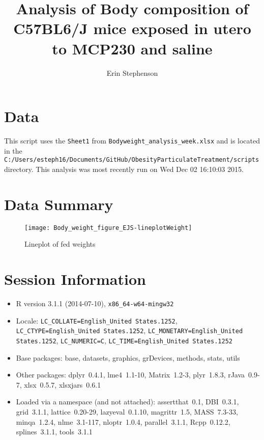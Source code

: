 \documentclass{article}
\begin{document}


\title{Analysis of Body composition of C57BL6/J mice exposed in utero to MCP230 and saline}
\author{Erin Stephenson}
\date{\toWeek}
\maketitle

\section*{Data}
This script uses the \verb+Sheet1+ from \verb+Bodyweight_analysis_week.xlsx+ and is located in the \verb+C:/Users/esteph16/Documents/GitHub/ObesityParticulateTreatment/scripts+ directory.  This analysis was most recently run on Wed Dec 02 16:10:03 2015.  

\section*{Data Summary}

\begin{figure}
\begin{center}
\texttt{[image: Body\_weight\_figure\_EJS-lineplotWeight]}
\end{center}
\caption{Lineplot of fed weights}
\label{fig:lineplotweight}
\end{figure}

\section*{Session Information}
\begin{itemize}\raggedright
  \item R version 3.1.1 (2014-07-10), \verb|x86_64-w64-mingw32|
  \item Locale: \verb|LC_COLLATE=English_United States.1252|, \verb|LC_CTYPE=English_United States.1252|, \verb|LC_MONETARY=English_United States.1252|, \verb|LC_NUMERIC=C|, \verb|LC_TIME=English_United States.1252|
  \item Base packages: base, datasets, graphics, grDevices, methods,
    stats, utils
  \item Other packages: dplyr~0.4.1, lme4~1.1-10, Matrix~1.2-3,
    plyr~1.8.3, rJava~0.9-7, xlsx~0.5.7, xlsxjars~0.6.1
  \item Loaded via a namespace (and not attached): assertthat~0.1,
    DBI~0.3.1, grid~3.1.1, lattice~0.20-29, lazyeval~0.1.10,
    magrittr~1.5, MASS~7.3-33, minqa~1.2.4, nlme~3.1-117, nloptr~1.0.4,
    parallel~3.1.1, Rcpp~0.12.2, splines~3.1.1, tools~3.1.1
\end{itemize}
\end{document}

